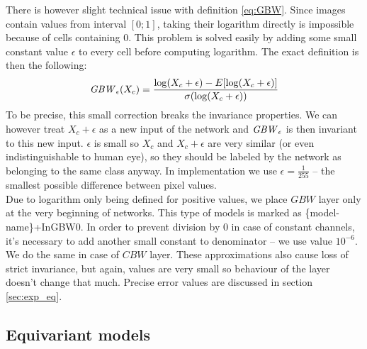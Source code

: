 There is however slight technical issue with definition \ref{eq:GBW}.
Since images contain values from interval $[0;1]$,
taking their logarithm directly is impossible because of
cells containing $0$. This problem is solved easily by adding some small constant value
$\epsilon$ to every cell before computing logarithm. The exact definition
is then the following:
\begin{equation}
\mathit{GBW}_{\epsilon}(X_c) =
    \frac{\log(X_c+\epsilon)-E[\log(X_c+\epsilon)]}{\sigma(\log(X_c+\epsilon))}
\end{equation}
To be precise, this small correction breaks the invariance properties.
We can however treat $X_c+\epsilon$ as a new input of the network
and $\mathit{GBW}_{\epsilon}$ is then invariant to this new input.
$\epsilon$ is small so $X_c$ and $X_c+\epsilon$ are very similar (or even
indistinguishable to human eye), so they should be labeled by the network as
belonging to the same class anyway. In implementation we use
$\epsilon=\frac{1}{255}$ -- the smallest possible difference between pixel
values.
\\ Due to logarithm only being defined for positive values, we place
$\mathit{GBW}$ layer only at the very beginning of networks. This type of models
is marked as \{model-name\}+InGBW0.
In order to prevent division by $0$ in case of constant channels, it's necessary
to add another small constant to denominator -- we use value $10^{-6}$. We do
the same in case of $\mathit{CBW}$ layer. These approximations also cause loss of
strict invariance, but again, values are very small so behaviour of the layer
doesn't change that much. Precise error values are discussed in section
\ref{sec:exp_eq}.



\subsection{Equivariant models}
\label{sec:equ_models}

